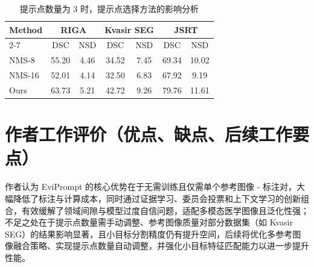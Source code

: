 \documentclass[12pt,a4paper]{article}
\begin{document}
	\begin{table}[htbp]
		\centering
		\setlength{\tabcolsep}{8pt} 
		\begin{tabular}{l c c c c c c}
			\hline
			Method & \multicolumn{2}{c}{RIGA} & \multicolumn{2}{c}{Kvasir SEG} & \multicolumn{2}{c}{JSRT} \\
			\cline{2-7}
			& DSC & NSD & DSC & NSD & DSC & NSD \\
			\hline
			NMS-8 & 55.20 & 4.46 & 34.52 & 7.45 & 69.34 & 10.02 \\
			NMS-16 & 52.01 & 4.14 & 32.50 & 6.83 & 67.92 & 9.19 \\
			Ours & 63.73 & 5.21 & 42.72 & 9.26 & 79.76 & 11.61 \\
			\hline
		\end{tabular}
		\caption{提示点数量为 3 时，提示点选择方法的影响分析}
		\label{tab:5}
	\end{table}
	\section{作者工作评价（优点、缺点、后续工作要点）}
	作者认为 EviPrompt 的核心优势在于无需训练且仅需单个参考图像 - 标注对，大幅降低了标注与计算成本，同时通过证据学习、委员会投票和上下文学习的创新组合，有效缓解了领域间隙与模型过度自信问题，适配多模态医学图像且泛化性强；不足之处在于提示点数量需手动调整、参考图像质量对部分数据集（如 Kvasir SEG）的结果影响显著，且小目标分割精度仍有提升空间，后续将优化多参考图像融合策略、实现提示点数量自动调整，并强化小目标特征匹配能力以进一步提升性能。
\end{document}
